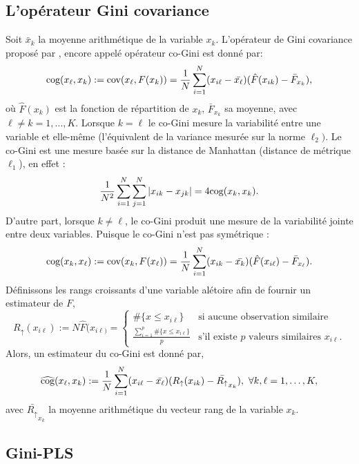 \subsection{L'opérateur Gini covariance}

Soit $\bar{x}_k$ la moyenne arithmétique de la variable $x_k$. L'opérateur de Gini covariance proposé par \citet{Schechtman03}, encore appelé opérateur co-Gini est donné par:
\begin{equation}\label{cog0}
\text{cog}(x_\ell,x_k) := \text{cov}(x_\ell,F(x_k)) = \frac{1}{N}\sum_{i=1}^N(x_{i\ell} -\bar{x_\ell})(\hat{F}(x_{ik})-\bar{F}_{x_k}),
\end{equation}
où $\hat{F}(x_{k})$ est la fonction de répartition de $x_k$, $\bar{F}_{x_k}$ sa moyenne, avec $\ell \neq k = 1,\ldots,K$. Lorsque $k=\ell$ le co-Gini mesure la variabilité entre une variable et elle-même (l'équivalent de la variance mesurée sur la norme $\ell_2)$. Le co-Gini est une mesure basée sur la distance de Manhattan (distance de métrique $\ell_1$), en effet :
\begin{equation}\notag
\frac{1}{N^2}\sum_{i=1}^N\sum_{j=1}^N |x_{ik} - x_{jk}| = 4\text{cog}(x_k,x_k).
\end{equation}
D'autre part, lorsque $k\neq \ell$, le co-Gini produit une mesure de la variabilité jointe entre deux variables. Puisque le co-Gini n'est pas symétrique :
\[
\text{cog}(x_k,x_\ell) := \text{cov}(x_k ,F(x_\ell)) = \frac{1}{N}\sum_{i=1}^N(x_{ik} -\bar{x_k})(\hat{F}(x_{i\ell})-\bar{F}_{x_\ell}).
\]
Définissons les rangs croissants d'une variable alétoire afin de fournir un estimateur de $F$,
\[
R_\uparrow(x_{i\ell}) := N\hat{F}(x_{i\ell)} = 
\left\{ \begin{array}{ll}
\#\{ x \leq x_{i\ell} \} & \text{si aucune observation similaire} \\
\frac{\sum_{i=1}^p\#\{ x \leq x_{i\ell}  \}}{p} & \text{s'il existe $p$ valeurs similaires $x_{i\ell}$.}
\end{array}
\right.
\]
Alors, un estimateur du co-Gini est donné par,
\begin{eqnarray}\label{cog}
\widehat{\text{cog}}(x_\ell,x_k) := \frac{1}{N}\sum_{i=1}^N(x_{i\ell} -\bar{x_\ell})(R_\uparrow(x_{ik})-\bar{R_\uparrow}_{x_k}), \ \forall k,\ell=1,\ldots,K,
\end{eqnarray}
avec $\bar{R_\uparrow}_{x_k}$ la moyenne arithmétique du vecteur rang de la variable $x_k$. 


\subsection{Gini-PLS}

